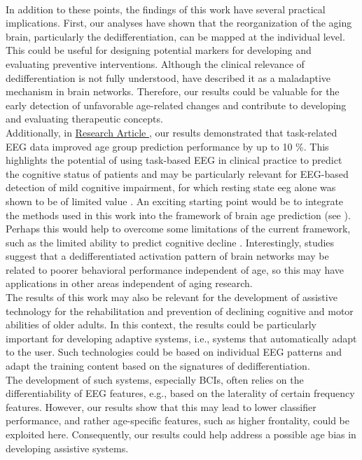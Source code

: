 \\
In addition to these points, the findings of this work have several practical implications. First, our analyses have shown that the reorganization of the aging brain, particularly the dedifferentiation, can be mapped at the individual level. This could be useful for designing potential markers for developing and evaluating preventive interventions. Although the clinical relevance of dedifferentiation is not fully understood, \citeauthor{Fornito2015} \cite{Fornito2015} have described it as a maladaptive mechanism in brain networks. Therefore, our results could be valuable for the early detection of unfavorable age-related changes and contribute to developing and evaluating therapeutic concepts.\\
Additionally, in \hyperref[results:paperII]{Research Article }, our results demonstrated that task-related EEG data improved age group prediction performance by up to 10 \%. This highlights the potential of using task-based EEG in clinical practice to predict the cognitive status of patients and may be particularly relevant for EEG-based detection of mild cognitive impairment, for which resting state \gls{eeg} alone was shown to be of limited value \cite{Froehlich2021, Farina2020}. An exciting starting point would be to integrate the methods used in this work into the framework of brain age prediction (see ). Perhaps this would help to overcome some limitations of the current framework, such as the limited ability to predict cognitive decline \cite{Tetereva2023}. Interestingly, studies suggest that a dedifferentiated activation pattern of brain networks may be related to poorer behavioral performance independent of age, so this may have applications in other areas independent of aging research.\\
The results of this work may also be relevant for the development of assistive technology for the rehabilitation and prevention of declining cognitive and motor abilities of older adults. In this context, the results could be particularly important for developing adaptive systems, i.e., systems that automatically adapt to the user. Such technologies could be based on individual EEG patterns and adapt the training content based on the signatures of dedifferentiation.\\
The development of such systems, especially BCIs, often relies on the differentiability of EEG features, e.g., based on the laterality of certain frequency features. However, our results show that this may lead to lower classifier performance, and rather age-specific features, such as higher frontality, could be exploited here. Consequently, our results could help address a possible age bias in developing assistive systems.

